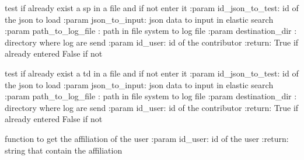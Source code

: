 \documentclass[letterpaper,10pt,english]{sphinxmanual}
\begin{document}

\begin{fulllineitems}
\label{\detokenize{QuChemPedIA.QuChemPedIA_lib:QuChemPedIA.QuChemPedIA_lib.import_file_lib.exist_sp}}
test if already exist a sp in a file and if not enter it
:param id\_json\_to\_test: id of the json to load
:param json\_to\_input: json data to input in elastic search
:param path\_to\_log\_file : path in file system to log file
:param destination\_dir : directory where log are send
:param id\_user: id of the contributor
:return: True if already entered False if not

\end{fulllineitems}


\begin{fulllineitems}
\label{\detokenize{QuChemPedIA.QuChemPedIA_lib:QuChemPedIA.QuChemPedIA_lib.import_file_lib.exist_td}}
test if already exist a td in a file and if not enter it
:param id\_json\_to\_test: id of the json to load
:param json\_to\_input: json data to input in elastic search
:param path\_to\_log\_file : path in file system to log file
:param destination\_dir : directory where log are send
:param id\_user: id of the contributor
:return: True if already entered False if not

\end{fulllineitems}


\begin{fulllineitems}
\label{\detokenize{QuChemPedIA.QuChemPedIA_lib:QuChemPedIA.QuChemPedIA_lib.import_file_lib.get_affiliation}}
function to get the affiliation of the user
:param id\_user: id of the user
:return: string that contain the affiliation

\end{fulllineitems}
\end{document}
